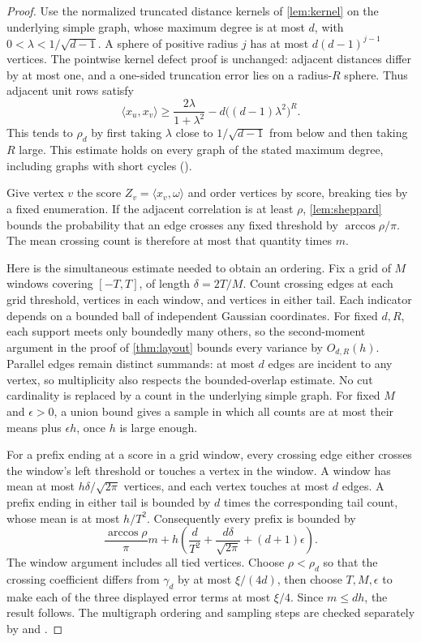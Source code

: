 \documentclass[11pt]{article}
\theoremstyle{plain}
\theoremstyle{definition}
\theoremstyle{remark}
\begin{document}
\begin{proof}
Use the normalized truncated distance kernels of \cref{lem:kernel} on the underlying simple
graph, whose maximum degree is at most $d$, with $0<\lambda<1/\sqrt{d-1}$.
A sphere of positive radius $j$ has at most
$d(d-1)^{j-1}$ vertices. The pointwise kernel defect proof is unchanged: adjacent distances
differ by at most one, and a one-sided truncation error lies on a radius-$R$ sphere.
Thus adjacent unit rows satisfy
\[
  \langle x_u,x_v\rangle\ge
  \frac{2\lambda}{1+\lambda^2}-d\bigl((d-1)\lambda^2\bigr)^R.
\]
This tends to $\rho_d$ by first taking $\lambda$ close to $1/\sqrt{d-1}$ from below
and then taking $R$ large. This estimate holds on every graph of the stated maximum
degree, including graphs with short cycles
().

Give vertex $v$ the score $Z_v=\langle x_v,\omega\rangle$ and order vertices by score,
breaking ties by a fixed enumeration. If the adjacent correlation is at least $\rho$,
\cref{lem:sheppard} bounds the probability that an edge crosses any fixed threshold by
$\arccos\rho/\pi$. The mean crossing count is therefore at most that quantity times $m$.

Here is the simultaneous estimate needed to obtain an ordering. Fix a grid of $M$ windows
covering $[-T,T]$, of length $\delta=2T/M$. Count crossing edges at each grid threshold,
vertices in each window, and vertices in either tail. Each indicator depends on a bounded
ball of independent Gaussian coordinates. For fixed $d,R$, each support meets only boundedly
many others, so the second-moment argument in the proof of \cref{thm:layout} bounds every
variance by $O_{d,R}(h)$.
Parallel edges remain distinct summands: at most $d$ edges are incident to any vertex,
so multiplicity also respects the bounded-overlap estimate. No cut cardinality is replaced
by a count in the underlying simple graph.
For fixed $M$ and $\epsilon>0$, a union bound gives a sample in which all counts are at most
their means plus $\epsilon h$, once $h$ is large enough.

For a prefix ending at a score in a grid window, every crossing edge either crosses the
window's left threshold or touches a vertex in the window. A window has mean at most
$h\delta/\sqrt{2\pi}$ vertices, and each vertex touches at most $d$ edges. A prefix ending
in either tail is bounded by $d$ times the corresponding tail count, whose mean is at most
$h/T^2$. Consequently every prefix is bounded by
\[
  \frac{\arccos\rho}{\pi}m+
  h\left(\frac d{T^2}+\frac{d\delta}{\sqrt{2\pi}}+(d+1)\epsilon\right).
\]
The window argument includes all tied vertices. Choose $\rho<\rho_d$ so that the crossing
coefficient differs from $\gamma_d$ by at most $\xi/(4d)$, then choose $T,M,\epsilon$
to make each of the three displayed error terms at most $\xi/4$. Since $m\le dh$, the
result follows. The multigraph ordering and sampling steps are checked separately by
 and
.
\end{proof}
\end{document}

